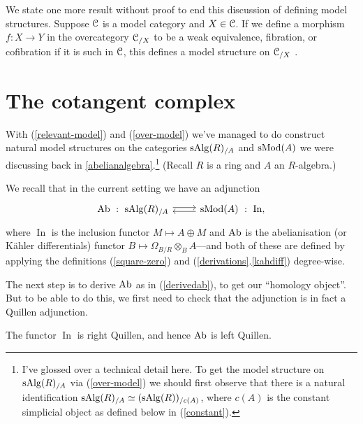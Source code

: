 \begin{nothing}
  \label{over-model}
  We state one more result without proof to end this discussion of
  defining model structures. Suppose $\mathcal{C}$ is a model category and $X
  \in \mathcal{C}$. If we define a morphism $f : X \to Y$ in the overcategory
  $\mathcal{C}_{/X}$ to be a weak equivalence, fibration, or cofibration if it
  is such in $\mathcal{C}$, this defines a model structure on $\mathcal{C}_{/X}$
  \cite{nlab-modelover}.
\end{nothing}


\section{The cotangent complex}

With (\ref{relevant-model}) and (\ref{over-model}) we've managed to do
construct natural model structures on the categories $\mathrm{s}\mathrm{Alg}(R)_{/A}$
and $\mathrm{s}\mathrm{Mod}(A)$ we were discussing back in \textsection
\ref{abelianalgebra}.\footnote{I've glossed over a technical detail
  here. To get the model structure on $\mathrm{s}\mathrm{Alg}(R)_{/A}$ via
  (\ref{over-model}) we should first observe that there is a natural
  identification $\mathrm{s}\mathrm{Alg}(R)_{/A} \simeq (\mathrm{s}\mathrm{Alg}(R))_{/c(A)}$, where
  $c(A)$ is the constant simplicial object as defined below in
  (\ref{constant}).} (Recall $R$ is a ring and $A$ an $R$-algebra.)

\newcommand{\In}{\operatorname{In}}

\begin{notation}
  We recall that in the current setting we have an adjunction
  \[
  \begin{tikzcd}
    \Ab \ : \ \s\Alg(R)_{/A} \rar[yshift=2pt] & \s\Mod(A) \ :\ \In,
    \lar[yshift=-2pt]
  \end{tikzcd}
  \]
  where $\In$ is the inclusion functor $M \mapsto A \oplus M$ and
  $\operatorname{Ab}$ is the abelianisation (or K\"ahler differentials) functor $B
  \mapsto \Omega_{B/R} \otimes_B A$---and both of these are defined by
  applying the definitions (\ref{square-zero}) and
  (\ref{derivations}.\ref{kahdiff}) degree-wise.
\end{notation}

The next step is to derive $\operatorname{Ab}$ as in (\ref{derivedab}), to get our
``homology object''. But to be able to do this, we first need to check
that the adjunction is in fact a Quillen adjunction.

\begin{lemma}
  The functor $\In$ is right Quillen, and hence $\operatorname{Ab}$ is left
  Quillen.
\end{lemma}

